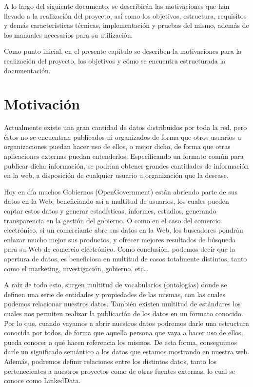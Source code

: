 

A lo largo del siguiente documento, se describirán las motivaciones que han
llevado a la realización del proyecto, así como los objetivos, estructura,
requisitos y demás características técnicas, implementación y pruebas del mismo,
además de los manuales necesarios para su utilización.

Como punto inicial, en el presente capitulo se describen la motivaciones para la
realización del proyecto, los objetivos y cómo se encuentra estructurada la
documentación.

\section{Motivación}

Actualmente existe una gran cantidad de datos distribuidos por toda la red, pero
éstos no se encuentran publicados ni organizados de forma que otros usuarios u
organizaciones puedan hacer uso de ellos, o mejor dicho, de forma que otras
aplicaciones externas puedan entenderlos. Especificando un formato común para
publicar dicha información, se podrían obtener grandes cantidades de información
en la web, a disposición de cualquier usuario u organización que la desease.

Hoy en día muchos Gobiernos (OpenGovernment) están abriendo parte de sus datos
en la Web, beneficiando así a multitud de usuarios, los cuales pueden captar
estos datos y generar estadísticas, informes, estudios, generando transparencia
en la gestión del gobierno. O como en el caso del comercio electrónico, si un
comerciante abre sus datos en la Web, los buscadores pondrán enlazar mucho mejor
sus productos, y ofrecer mejores resultados de búsqueda para su Web de comercio
electrónico. Como conclusión, podemos decir que la apertura de datos, es
beneficiosa en multitud de casos totalmente distintos, tanto como el marketing,
investigación, gobierno, etc\ldots

A raíz de todo esto, surgen multitud de vocabularios (ontologías) donde se
definen una serie de entidades y propiedades de las mismas, con las cuales
podemos relacionar nuestros datos. También existen multitud de estándares los
cuales nos permiten realizar la publicación de los datos en un formato conocido.
Por lo que, cuando vayamos a abrir nuestros datos podremos darle una estructura
conocida por todos, de forma que aquella persona que vaya a hacer uso de ellos,
pueda conocer a qué hacen referencia los mismos. De esta forma, conseguimos
darle un significado semántico a los datos que estamos mostrando en nuestra web.
Además, podremos definir relaciones entre los distintos datos, tanto los
pertenecientes a nuestros proyectos como de otras fuentes externas, lo cual se
conoce como LinkedData.

